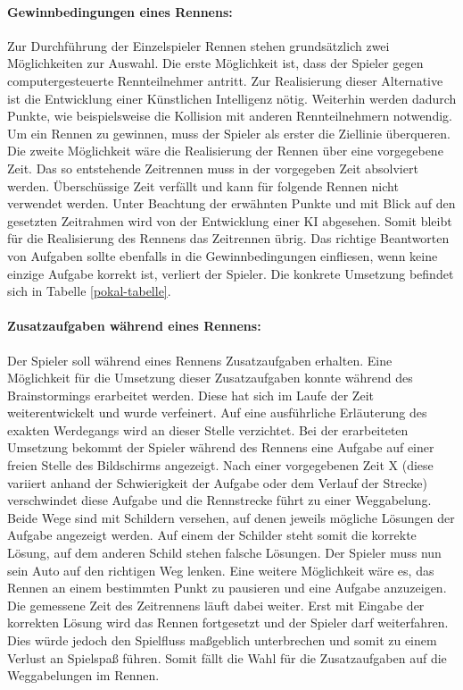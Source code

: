 		\paragraph{Gewinnbedingungen eines Rennens:}\label{gewinnbedinungen}
		Zur Durchführung der Einzelspieler Rennen stehen grundsätzlich zwei Möglichkeiten zur Auswahl. Die erste Möglichkeit ist, dass der Spieler gegen computergesteuerte Rennteilnehmer antritt. Zur Realisierung dieser Alternative ist die Entwicklung einer Künstlichen Intelligenz nötig. Weiterhin werden dadurch Punkte, wie beispielsweise die Kollision mit anderen Rennteilnehmern notwendig. Um ein Rennen zu gewinnen, muss der Spieler als erster die Ziellinie überqueren.
		Die zweite Möglichkeit wäre die Realisierung der Rennen über eine vorgegebene Zeit. Das so entstehende Zeitrennen muss in der vorgegeben Zeit absolviert werden. Überschüssige Zeit verfällt und kann für folgende Rennen nicht verwendet werden.
		Unter Beachtung der erwähnten Punkte und mit Blick auf den gesetzten Zeitrahmen wird von der Entwicklung einer KI abgesehen. Somit bleibt für die Realisierung des Rennens das Zeitrennen übrig.
		Das richtige Beantworten von Aufgaben sollte ebenfalls in die Gewinnbedingungen einfliesen, wenn keine einzige Aufgabe korrekt ist, verliert der Spieler. Die konkrete Umsetzung befindet sich in Tabelle \ref{pokal-tabelle}.

		\paragraph{Zusatzaufgaben während eines Rennens:}\label{par:aufgaben}
		Der Spieler soll während eines Rennens Zusatzaufgaben erhalten. Eine Möglichkeit für die Umsetzung dieser Zusatzaufgaben konnte während des Brainstormings erarbeitet werden. Diese hat sich im Laufe der Zeit weiterentwickelt und wurde verfeinert. Auf eine ausführliche Erläuterung des exakten Werdegangs wird an dieser Stelle verzichtet.
		Bei der erarbeiteten Umsetzung bekommt der Spieler während des Rennens eine Aufgabe auf einer freien Stelle des Bildschirms angezeigt. Nach einer vorgegebenen Zeit X (diese variiert anhand der Schwierigkeit der Aufgabe oder dem Verlauf der Strecke) verschwindet diese Aufgabe und die Rennstrecke führt zu einer Weggabelung. Beide Wege sind mit Schildern versehen, auf denen jeweils mögliche Lösungen der Aufgabe angezeigt werden. Auf einem der Schilder steht somit die korrekte Lösung, auf dem anderen Schild stehen falsche Lösungen. Der Spieler muss nun sein Auto auf den richtigen Weg lenken.
		Eine weitere Möglichkeit wäre es, das Rennen an einem bestimmten Punkt zu pausieren und eine Aufgabe anzuzeigen. Die gemessene Zeit des Zeitrennens läuft dabei weiter. Erst mit Eingabe der korrekten Lösung wird das Rennen fortgesetzt und der Spieler darf weiterfahren. Dies würde jedoch den Spielfluss maßgeblich unterbrechen und somit zu einem Verlust an Spielspaß führen. Somit fällt die Wahl für die Zusatzaufgaben auf die Weggabelungen im Rennen.

